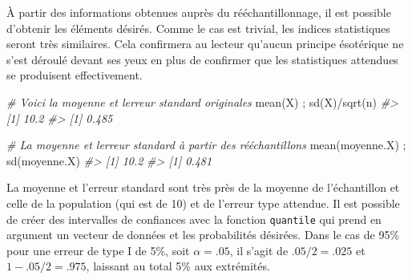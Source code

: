 \documentclass[
]{book}
\newenvironment{Shaded}{}{}
\newcommand{\CommentTok}[1]{\textit{#1}}
\newcommand{\FunctionTok}[1]{#1}
\newcommand{\NormalTok}[1]{#1}
\newcommand{\SpecialCharTok}[1]{#1}
\begin{document}
À partir des informations obtenues auprès du rééchantillonnage, il est possible d'obtenir les éléments désirés. Comme le cas est trivial, les indices statistiques seront très similaires. Cela confirmera au lecteur qu'aucun principe ésotérique ne s'est déroulé devant ses yeux en plus de confirmer que les statistiques attendues se produisent effectivement.

\begin{Shaded}
\begin{Highlighting}[]
\CommentTok{\# Voici la moyenne et l\textquotesingle{}erreur standard originales}
\FunctionTok{mean}\NormalTok{(X) ; }\FunctionTok{sd}\NormalTok{(X)}\SpecialCharTok{/}\FunctionTok{sqrt}\NormalTok{(n)}
\CommentTok{\#\textgreater{} [1] 10.2}
\CommentTok{\#\textgreater{} [1] 0.485}

\CommentTok{\# La moyenne et l\textquotesingle{}erreur standard à partir des rééchantillons}
\FunctionTok{mean}\NormalTok{(moyenne.X)  ; }\FunctionTok{sd}\NormalTok{(moyenne.X)}
\CommentTok{\#\textgreater{} [1] 10.2}
\CommentTok{\#\textgreater{} [1] 0.481}
\end{Highlighting}
\end{Shaded}

La moyenne et l'erreur standard sont très près de la moyenne de l'échantillon et celle de la population (qui est de 10) et de l'erreur type attendue. Il est possible de créer des intervalles de confiances avec la fonction \texttt{quantile} qui prend en argument un vecteur de données et les probabilités désirées. Dans le cas de 95\% pour une erreur de type I de 5\%, soit \(\alpha=.05\), il s'agit de \(.05/2 = .025\) et \(1-.05/2= .975\), laissant au total 5\% aux extrémités.
\end{document}
